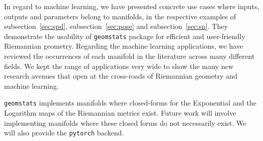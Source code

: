 \documentclass{article}
\begin{document}
In regard to machine learning, we have presented concrete use cases where inputs, outputs and parameters belong to manifolds, in the respective examples of subsection~\ref{sec:spd}, subsection~\ref{sec:pose} and subsection~\ref{sec:sn}. They demonstrate the usability of \texttt{geomstats} package for efficient and user-friendly Riemannian geometry. Regarding the machine learning applications, we have reviewed the occurrences of each manifold in the literature across many different fields. We kept the range of applications very wide to show the many new research avenues that open at the cross-roads of Riemannian geometry and machine learning.

\texttt{geomstats} implements manifolds where closed-forms for the Exponential and the Logarithm maps of the Riemannian metrics exist. Future work will involve implementing manifolds where these closed forms do not necessarily exist. We will also provide the \texttt{pytorch} backend.


\small



\end{document}
